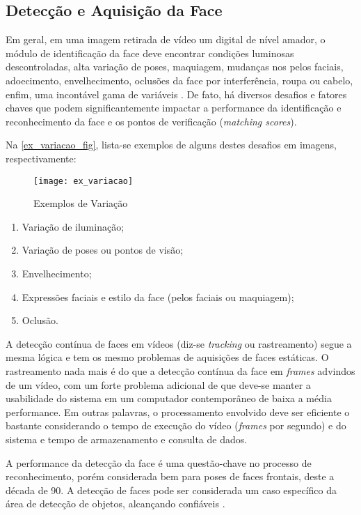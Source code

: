 \subsection{Detecção e Aquisição da Face}\label{subsec:aquisicao_imagem}

Em geral, em uma imagem retirada de vídeo um digital de nível amador, o módulo de identificação da face deve encontrar condições luminosas descontroladas, alta variação de poses, maquiagem, mudanças nos pelos faciais, adoecimento, envelhecimento, oclusões da face por interferência, roupa ou cabelo, enfim, uma incontável gama de variáveis \cite{tony_columbia}. De fato, há diversos desafios e fatores chaves que podem significantemente impactar a performance da identificação e reconhecimento da face e os pontos de verificação (\textit{matching scores}).

Na \autoref{ex_variacao_fig}, lista-se exemplos de alguns destes desafios em imagens, respectivamente:

\begin{figure}[h]
	\centering
	\texttt{[image: ex\_variacao]}
	\caption{Exemplos de Variação}
	\label{ex_variacao_fig}
\end{figure}


\begin{enumerate}[label=(\alph*)]
	\item Variação de iluminação;
	\item Variação de poses ou pontos de visão;
	\item Envelhecimento;
	\item Expressões faciais e estilo da face (pelos faciais ou maquiagem);
	\item Oclusão.
\end{enumerate}


A detecção contínua de faces em vídeos (diz-se \textit{tracking} ou rastreamento) segue a mesma lógica e tem os mesmo problemas de aquisições de faces estáticas. O rastreamento nada mais é do que a detecção contínua da face em \textit{frames} advindos de um vídeo, com um forte problema adicional de que deve-se manter a usabilidade do sistema em um computador contemporâneo de baixa a média performance. Em outras palavras, o processamento envolvido deve ser eficiente o bastante considerando o tempo de execução do vídeo (\textit{frames} por segundo) e do sistema e tempo de armazenamento e consulta de dados.

A performance da detecção da face é uma questão-chave no processo de reconhecimento, porém considerada bem para poses de faces frontais, deste a década de 90. A detecção de faces pode ser considerada um caso específico da área de detecção de objetos, alcançando confiáveis \cite{stats_face_detection_IEEE}.

